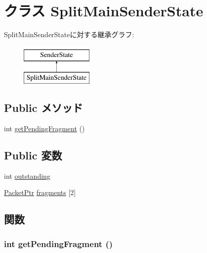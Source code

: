 \hypertarget{classTimingSimpleCPU_1_1SplitMainSenderState}{
\section{クラス SplitMainSenderState}
\label{classTimingSimpleCPU_1_1SplitMainSenderState}
}
SplitMainSenderStateに対する継承グラフ:\begin{figure}[H]
\begin{center}
\leavevmode
\includegraphics[height=2cm]{classTimingSimpleCPU_1_1SplitMainSenderState}
\end{center}
\end{figure}
\subsection*{Public メソッド}
\begin{DoxyCompactItemize}
\item 
int \hyperlink{classTimingSimpleCPU_1_1SplitMainSenderState_a6a8a7a1de5436ca2f45d2bfe337c82db}{getPendingFragment} ()
\end{DoxyCompactItemize}
\subsection*{Public 変数}
\begin{DoxyCompactItemize}
\item 
int \hyperlink{classTimingSimpleCPU_1_1SplitMainSenderState_a3fc62072fe6e979a41b2e68bda15893a}{outstanding}
\item 
\hyperlink{classPacket}{PacketPtr} \hyperlink{classTimingSimpleCPU_1_1SplitMainSenderState_a71710e2d070a54a76c47d9cfc67b9d87}{fragments} \mbox{[}2\mbox{]}
\end{DoxyCompactItemize}


\subsection{関数}
\hypertarget{classTimingSimpleCPU_1_1SplitMainSenderState_a6a8a7a1de5436ca2f45d2bfe337c82db}{
\subsubsection[{getPendingFragment}]{\setlength{\rightskip}{0pt plus 5cm}int getPendingFragment ()}}
\label{classTimingSimpleCPU_1_1SplitMainSenderState_a6a8a7a1de5436ca2f45d2bfe337c82db}



